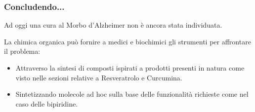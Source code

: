 \documentclass[9pt]{beamer}
\begin{document}
\begin{frame}
	\frametitle{Concludendo...}
	Ad oggi una cura al Morbo d'Alzheimer non è ancora stata individuata.
	
	La chimica organica può fornire a medici e biochimici gli strumenti per affrontare il problema:
	\begin{itemize}

		\item Attraverso la sintesi di composti ispirati a prodotti 	presenti in natura come visto nelle sezioni relative a Resveratrolo e Curcumina.
		\item Sintetizzando molecole ad hoc sulla base delle funzionalità richieste come nel caso delle bipiridine.
		      
	\end{itemize}
\end{frame}


\begin{frame}
\end{frame}
\end{document}
